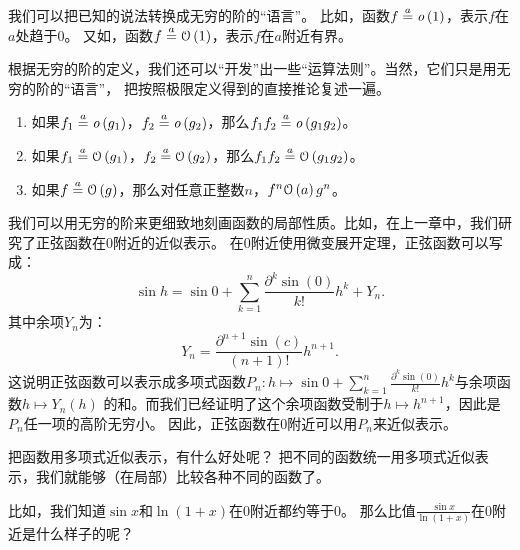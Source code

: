 \documentclass[12pt,UTF8]{ctexbook}
\begin{document}
我们可以把已知的说法转换成无穷的阶的“语言”。
比如，函数$f \overset{a}{=} \mathit{o}\left(1\right)$，表示$f$在$a$处趋于$0$。
又如，函数$f \overset{a}{=} \mathcal{O}\left(1\right)$，表示$f$在$a$附近有界。

根据无穷的阶的定义，我们还可以“开发”出一些“运算法则”。当然，它们只是用无穷的阶的“语言”，
把按照极限定义得到的直接推论复述一遍。
\begin{enumerate}
    \item 如果$f_1 \overset{a}{=} \mathit{o}\left(g_1\right)$，$f_2 \overset{a}{=} \mathit{o}\left(g_2\right)$，那么$f_1 f_2 \overset{a}{=} \mathit{o}\left(g_1 g_2\right)$。
    \item 如果$f_1 \overset{a}{=} \mathcal{O}\left(g_1\right)$，$f_2 \overset{a}{=} \mathcal{O}\left(g_2\right)$，那么$f_1 f_2 \overset{a}{=} \mathcal{O}\left(g_1 g_2\right)$。
    \item 如果$f \overset{a}{=} \mathcal{O}\left(g\right)$，那么对任意正整数$n$，$f^n \mathcal{O}\left(a\right){g^n}$。
\end{enumerate}

我们可以用无穷的阶来更细致地刻画函数的局部性质。比如，在上一章中，我们研究了正弦函数在$0$附近的近似表示。
在$0$附近使用微变展开定理，正弦函数可以写成：
$$ \sin{h} = \sin{0} + \sum_{k=1}^n \frac{\partial^k \sin (0)}{k!}h^k + Y_n. $$
其中余项$Y_n$为：
$$ Y_n = \frac{\partial^{n+1} \sin (c)}{(n+1)!}h^{n+1}. $$
这说明正弦函数可以表示成多项式函数$P_n :h \mapsto \sin{0} + \sum_{k=1}^n \frac{\partial^k \sin (0)}{k!}h^k$与余项函数$h\mapsto Y_n(h)$
的和。而我们已经证明了这个余项函数受制于$h\mapsto h^{n+1}$，因此是$P_n$任一项的高阶无穷小。
因此，正弦函数在$0$附近可以用$P_n$来近似表示。

把函数用多项式近似表示，有什么好处呢？
把不同的函数统一用多项式近似表示，我们就能够（在局部）比较各种不同的函数了。

比如，我们知道$\sin{x}$和$\ln{(1+x)}$在$0$附近都约等于$0$。
那么比值$\frac{\sin{x}}{\ln{(1 + x)}}$在$0$附近是什么样子的呢？
\end{document}
